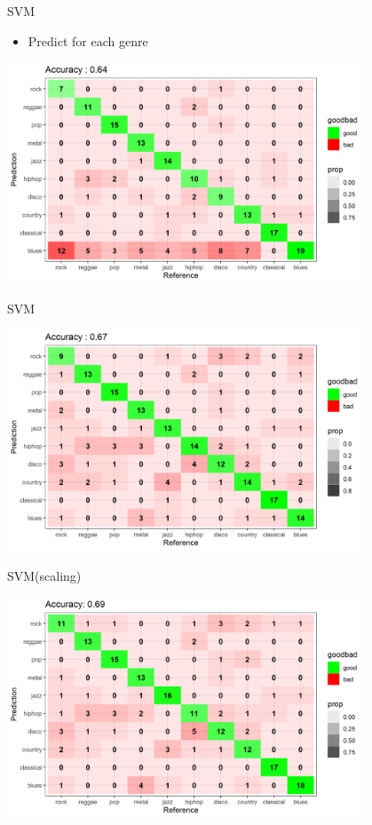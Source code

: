 \documentclass[11pt]{beamer}
\begin{document}
\begin{frame}{SVM}
\begin{itemize}
    \item Predict for each genre
\end{itemize}
\begin{center}
    \includegraphics[width=0.8\textwidth]{confusionMatrix_ohencoding_std.png}
\end{center}
\end{frame}

\begin{frame}{SVM}
\begin{center}
    \includegraphics[width=0.8\textwidth]{confusionMatrix_svm.png}
\end{center}
\end{frame}

\begin{frame}{SVM(scaling)}
\begin{center}
    \includegraphics[width=0.8\textwidth]{confusionMatrix_svm_std.png}
\end{center}
\end{frame}
\end{document}
